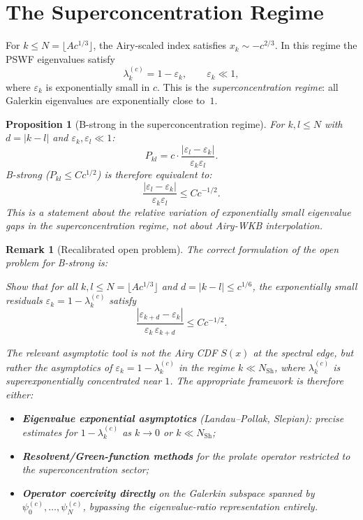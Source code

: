 \documentclass[12pt,a4paper]{article}
\newtheorem{proposition}[theorem]{Proposition}
\newtheorem{remark}[theorem]{Remark}
\newcommand{\lam}[1]{\lambda_{#1}^{(c)}}
\newcommand{\pswf}[1]{\psi_{#1}^{(c)}}
\begin{document}
\section{The Superconcentration Regime}
\label{sec:superconc}

For $k \leq N = \lfloor Ac^{1/3}\rfloor$, the Airy-scaled index
satisfies $x_k \sim -c^{2/3}$.
In this regime the PSWF eigenvalues satisfy
\[
  \lam{k} = 1 - \varepsilon_k,
  \qquad \varepsilon_k \ll 1,
\]
where $\varepsilon_k$ is exponentially small in $c$.
This is the \emph{superconcentration regime}:
all Galerkin eigenvalues are exponentially close to~$1$.

\begin{proposition}[B-strong in the superconcentration regime]
\label{prop:superconc}
For $k, l \leq N$ with $d = |k-l|$ and $\varepsilon_k, \varepsilon_l
\ll 1$:
\[
  P_{kl}
  = c \cdot \frac{|\varepsilon_l - \varepsilon_k|}{\varepsilon_k \varepsilon_l}.
\]
B-strong ($P_{kl} \leq Cc^{1/2}$) is therefore equivalent to:
\[
  \frac{|\varepsilon_l - \varepsilon_k|}{\varepsilon_k \varepsilon_l}
  \leq C c^{-1/2}.
\]
This is a statement about the \emph{relative variation of
exponentially small eigenvalue gaps} in the superconcentration
regime, not about Airy-WKB interpolation.
\end{proposition}

\begin{remark}[Recalibrated open problem]
\label{rem:recalibrated}
The correct formulation of the open problem for B-strong is:

\medskip
\textit{Show that for all $k, l \leq N = \lfloor Ac^{1/3}\rfloor$
and $d = |k-l| \leq c^{1/6}$, the exponentially small
residuals $\varepsilon_k = 1 - \lam{k}$ satisfy}
\[
  \frac{|\varepsilon_{k+d} - \varepsilon_k|}{\varepsilon_k \,
  \varepsilon_{k+d}} \leq C c^{-1/2}.
\]

\noindent
The relevant asymptotic tool is not the Airy CDF $S(x)$ at
the spectral edge, but rather the asymptotics of
$\varepsilon_k = 1 - \lam{k}$ in the regime $k \ll N_{\mathrm{Sh}}$,
where $\lam{k}$ is superexponentially concentrated near $1$.
The appropriate framework is therefore either:
\begin{itemize}[nosep]
  \item \textbf{Eigenvalue exponential asymptotics}
        (Landau--Pollak, Slepian): precise estimates for
        $1 - \lam{k}$ as $k \to 0$ or $k \ll N_{\mathrm{Sh}}$;
  \item \textbf{Resolvent/Green-function methods}
        for the prolate operator restricted to the
        superconcentration sector;
  \item \textbf{Operator coercivity directly}
        on the Galerkin subspace spanned by $\pswf{0}, \ldots, \pswf{N}$,
        bypassing the eigenvalue-ratio representation entirely.
\end{itemize}
\end{remark}
\end{document}
